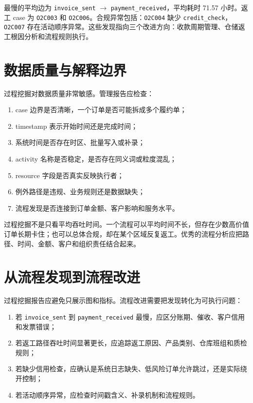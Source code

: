 \documentclass[UTF8,fontset=fandol,openany,zihao=-4]{ctexbook}
\begin{document}
最慢的平均边为 \texttt{invoice\_sent} \(\rightarrow\) \texttt{payment\_received}，平均耗时 71.57 小时。返工 case 为 \texttt{O2C003} 和 \texttt{O2C006}。合规异常包括：\texttt{O2C004} 缺少 \texttt{credit\_check}，\texttt{O2C007} 存在活动顺序异常。这些发现指向三个改进方向：收款周期管理、仓储返工根因分析和流程规则执行。

\section{数据质量与解释边界}

过程挖掘对数据质量非常敏感。管理报告应检查：
\begin{enumerate}
  \item case 边界是否清晰，一个订单是否可能拆成多个履约单；
  \item timestamp 表示开始时间还是完成时间；
  \item 系统时间是否存在时区、批量写入或补录；
  \item activity 名称是否稳定，是否存在同义词或粒度混乱；
  \item resource 字段是否真实反映执行者；
  \item 例外路径是违规、业务规则还是数据缺失；
  \item 流程发现是否连接到订单金额、客户影响和服务水平。
\end{enumerate}

过程挖掘不是只看平均吞吐时间。一个流程可以平均时间不长，但存在少数高价值订单长期卡住；也可以总体合规，却在某个区域反复返工。优秀的流程分析应把路径、时间、金额、客户和组织责任结合起来。

\section{从流程发现到流程改进}

过程挖掘报告应避免只展示图和指标。流程改进需要把发现转化为可执行问题：
\begin{enumerate}
  \item 若 \texttt{invoice\_sent} 到 \texttt{payment\_received} 最慢，应区分账期、催收、客户信用和发票错误；
  \item 若返工路径吞吐时间显著更长，应追踪返工原因、产品类别、仓库班组和质检规则；
  \item 若缺少信用检查，应确认是系统日志缺失、低风险订单允许跳过，还是实际绕开控制；
  \item 若活动顺序异常，应检查时间戳含义、补录机制和流程规则。
\end{enumerate}
\end{document}
